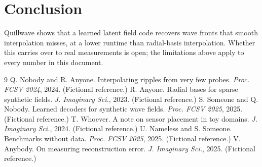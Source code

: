 \documentclass[11pt,a4paper]{article}
\begin{document}
\section{Conclusion}
Quillwave shows that a learned latent field code recovers wave fronts that smooth interpolation
misses, at a lower runtime than radial-basis interpolation. Whether this carries over to real
measurements is open; the limitations above apply to every number in this document.

\begin{thebibliography}{9}\small
{} Q. Nobody and R. Anyone. Interpolating ripples from very few probes. \emph{Proc. FCSV 2024}, 2024. (Fictional reference.)
 R. Anyone. Radial bases for sparse synthetic fields. \emph{J. Imaginary Sci.}, 2023. (Fictional reference.)
 S. Someone and Q. Nobody. Learned decoders for synthetic wave fields. \emph{Proc. FCSV 2025}, 2025. (Fictional reference.)
 T. Whoever. A note on sensor placement in toy domains. \emph{J. Imaginary Sci.}, 2024. (Fictional reference.)
 U. Nameless and S. Someone. Benchmarks without data. \emph{Proc. FCSV 2025}, 2025. (Fictional reference.)
 V. Anybody. On measuring reconstruction error. \emph{J. Imaginary Sci.}, 2025. (Fictional reference.)
\end{thebibliography}
\end{document}
